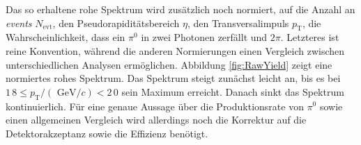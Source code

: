 \newline
Das so erhaltene rohe Spektrum wird zusätzlich noch normiert, auf die Anzahl an \textit{events} $N_\text{evt}$, den Pseudorapiditätsbereich $\eta$, den Transversalimpuls $p_\text{T}$, die Wahrscheinlichkeit, dass ein $\pi^{0}$ in zwei Photonen zerfällt und $2\pi$.
Letzteres ist reine Konvention, während die anderen Normierungen einen Vergleich zwischen unterschiedlichen Analysen ermöglichen.
Abbildung \ref{fig:RawYield} zeigt eine normiertes rohes Spektrum.
Das Spektrum steigt zunächst leicht an, bis es bei $1\,8 \leq p_{\text{T}}/(\text{ GeV}/c) < 2\,0$ sein Maximum erreicht.
Danach sinkt das Spektrum kontinuierlich.
\newline
Für eine genaue Aussage über die Produktionsrate von $\pi^{0}$ sowie einen allgemeinen Vergleich wird allerdings noch die Korrektur auf die Detektorakzeptanz sowie die Effizienz benötigt.